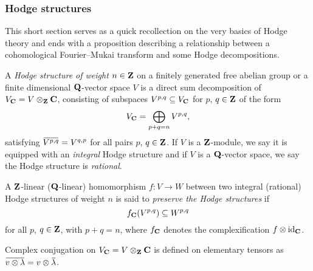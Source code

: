 \subsubsection*{Hodge structures}

This short section serves as a quick recollection on the very basics of Hodge theory and ends with a proposition describing a relationship between a cohomological Fourier--Mukai transform and some Hodge decompositions. 

\begin{definition}
    A \emph{Hodge structure of weight $n \in \mathbf Z$} on a finitely generated free abelian group or a finite dimensional $\mathbf Q$-vector space $V$ is a direct sum decomposition of $V_\mathbf C = V \otimes_\mathbf Z \mathbf C$, consisting of subspaces $V^{p,q} \subseteq V_\mathbf C$ for $p$, $q \in \mathbf Z$ of the form
    \[  
        V_\mathbf C = \bigoplus_{p+q = n} V^{p,q},
    \]
    satisfying $\ols{V^{p,q}} = V^{q,p}$ for all pairs $p$, $q \in \mathbf Z$. If $V$ is a $\mathbf Z$-module, we say it is equipped with an \emph{integral} Hodge structure and if $V$ is a $\mathbf Q$-vector space, we say the Hodge structure is \emph{rational}.
    
    A $\mathbf Z$-linear (\resp $\mathbf Q$-linear) homomorphism $f \colon V \to W$ between two integral (\resp rational) Hodge structures of weight $n$ is said to \emph{preserve the Hodge structures} if
    \[
        f_\mathbf C(V^{p,q}) \subseteq W^{p,q}
    \]  
    for all $p$, $q \in \mathbf Z$, with $p + q = n$, where $f_\mathbf C$ denotes the complexification $f \otimes \operatorname{id}_{\mathbf C}$.
\end{definition}

\begin{remark}
    Complex conjugation on $V_\mathbf C = V \otimes_\mathbf Z \mathbf C$ is defined on elementary tensors as $\ols{v \otimes \lambda} = v \otimes \ols{\lambda}$.
\end{remark}

